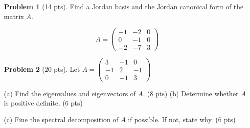 \documentclass[12pt]{amsart}
\theoremstyle{definition}
\newtheorem{prob}{Problem}
\begin{document}
\newpage

\begin{prob}[14 pts]
Find a Jordan basis and the Jordan canonical form of the matrix $A$.

\[A=\begin{pmatrix}
	-1&-2&0\\0&-1&0\\-2&-7&3
\end{pmatrix}\]
	
\end{prob}
\newpage

\begin{prob}[20 pts]
	Let $A=\begin{pmatrix}
		3&-1&0\\-1&2&-1\\0&-1&3
	\end{pmatrix}$
	
	(a) Find the eigenvalues and eigenvectors of $A$. (8 pts)
	\vspace{10cm}
	\newpage
	(b) Determine whether $A$ is positive definite. (6 pts) \vspace{8cm}
	
	(c) Fine the spectral decomposition of $A$ if possible. If not, state why. (6 pts)
\end{prob}
\end{document}
